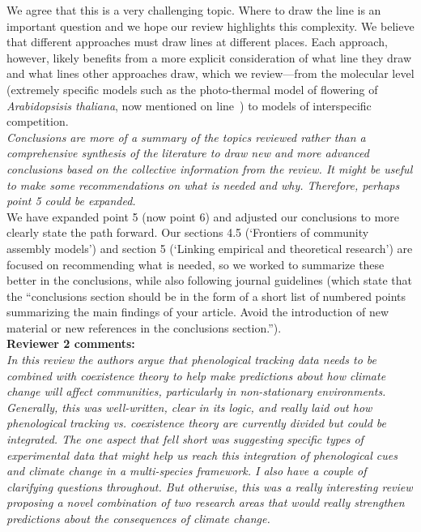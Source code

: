 \documentclass[11pt]{article}
\newcommand{\lr}[1]{line~\lineref{#1}}
\begin{document}
We agree that this is a very challenging topic. Where to draw the line is an important question and we hope our review highlights this complexity. We believe that different approaches must draw lines at different places. Each approach, however, likely benefits from a more explicit consideration of what line they draw and what lines other approaches draw, which we review---from the molecular level (extremely specific models such as the photo-thermal model of flowering of  \emph{Arabidopsisis thaliana}, now mentioned on \lr{r2arab}) to models of interspecific competition. \\

\emph{Conclusions are more of a summary of the topics reviewed rather than a comprehensive
synthesis of the literature to draw new and more advanced conclusions based on the collective
information from the review. It might be useful to make some recommendations on what is
needed and why. Therefore, perhaps point 5 could be expanded.}\\

We have expanded point 5 (now point 6) and adjusted our conclusions to more clearly state the path forward. Our sections 4.5 (`Frontiers of community assembly models') and section 5 (`Linking empirical and theoretical research') are focused on recommending what is needed, so we worked to summarize these better in the conclusions, while also following journal guidelines (which state that the ``conclusions section should be in the form of a short list of numbered points summarizing the main findings of your article. Avoid the introduction of new material or new references in the conclusions section.'').  \\

{\bf Reviewer 2 comments:} \\

\emph{In this review the authors argue that phenological tracking data needs to be combined with
coexistence theory to help make predictions about how climate change will affect communities,
particularly in non-stationary environments. Generally, this was well-written, clear in its
logic, and really laid out how phenological tracking vs. coexistence theory are currently
divided but could be integrated. The one aspect that fell short was suggesting specific types
of experimental data that might help us reach this integration of phenological cues and
climate change in a multi-species framework. I also have a couple of clarifying questions
throughout. But otherwise, this was a really interesting review proposing a novel combination
of two research areas that would really strengthen predictions about the consequences of
climate change.}\\
\end{document}
